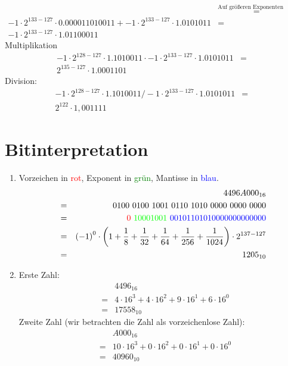 \documentclass[DIN, pagenumber=false, fontsize=11pt, parskip=half]{scrartcl}
\begin{document}
\begin{enumerate}[label=(\alph*)]
\begin{eqnarray*}
                &\stackrel{\text{Auf größeren Exponenten normalisieren}}{=}&\\
                -1 \cdot 2^{133-127} \cdot 0.000011010011 + -1 \cdot 2^{133-127} \cdot 1.0101011 &=&\\
                -1 \cdot 2^{133-127} \cdot 1.01100011
            \end{eqnarray*}
            Multiplikation
            \begin{eqnarray*}
                -1 \cdot 2^{128-127} \cdot 1.1010011 \cdot -1 \cdot 2^{133-127} \cdot 1.0101011 &=&\\
                2^{135-127} \cdot 1.0001101
            \end{eqnarray*}
            Division:
            \begin{eqnarray*}
                -1 \cdot 2^{128-127} \cdot 1.1010011 / -1 \cdot 2^{133-127} \cdot 1.0101011 &=&\\
                2^{122} \cdot 1,001111
            \end{eqnarray*}
    \end{enumerate}
    \section{Bitinterpretation}
    \begin{enumerate}[label=(\alph*)]
        \item Vorzeichen in \textcolor{red}{rot}, Exponent in \textcolor{green}{grün}, Mantisse in \textcolor{blue}{blau}.
            \begin{eqnarray*}
                &&{4496A000}_{16} \\&=&
                0100\ 0100\ 1001\ 0110\ 1010\ 0000\ 0000\ 0000 \\&=& 
                \textcolor{red}{0}\ \textcolor{green}{10001001}\ \textcolor{blue}{00101101010000000000000} \\&=&
                {(-1)}^0 \cdot \left(1+\frac{1}{8}+\frac{1}{32}+\frac{1}{64}+\frac{1}{256}+\frac{1}{1024}\right) \cdot 2^{137-127} \\&=&
                {1205}_{10}
            \end{eqnarray*}
        \item
            Erste Zahl:
            \begin{eqnarray*}
                &&{4496}_{16} \\&=&
                4 \cdot 16^3 + 4 \cdot 16^2 + 9 \cdot 16^1 + 6 \cdot 16^0 \\&=&
                {17558}_{10}
            \end{eqnarray*}
            Zweite Zahl (wir betrachten die Zahl als vorzeichenlose Zahl):
            \begin{eqnarray*}
                &&{A000}_{16} \\&=&
                10 \cdot 16^3 + 0 \cdot 16^2 + 0 \cdot 16^1 + 0 \cdot 16^0 \\&=&
                {40960}_{10}
            \end{eqnarray*}
    \end{enumerate}
\end{document}
